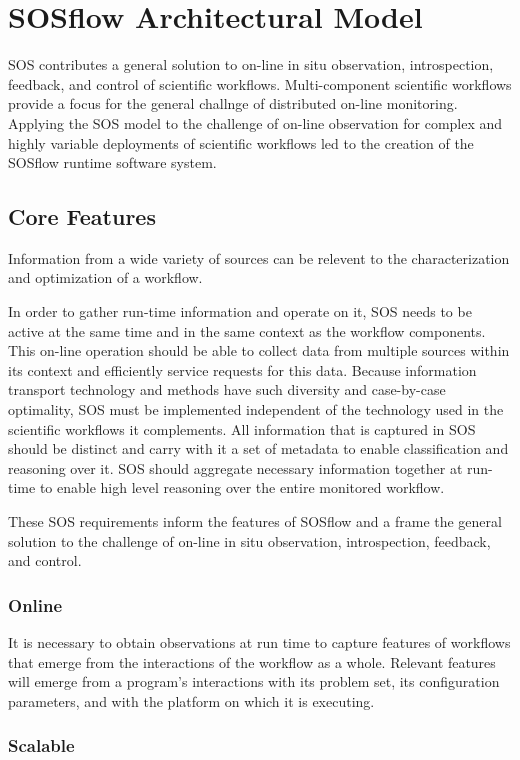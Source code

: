 
\section{SOSflow Architectural Model}
%
SOS contributes a general solution to on-line in situ
observation, introspection, feedback, and control of scientific
workflows.
%
Multi-component scientific workflows provide a focus for the
general challnge of distributed on-line monitoring.
%
Applying the SOS model to the challenge of on-line observation for
complex and highly variable deployments of scientific workflows led to
the creation of the SOSflow runtime software system.
%
\subsection{Core Features}
%
Information from a wide variety of sources can be relevent to the
characterization and optimization of a workflow.
%
\par
%
In order to gather run-time information and operate on it, SOS needs
to be active at the same time and in the same context as the workflow
components.
%
This on-line operation should be able to collect data from multiple
sources within its context and efficiently service requests
for this data.
%
Because information transport technology and methods have such
diversity and case-by-case optimality, SOS must be implemented
independent of the technology used in the scientific workflows it
complements.
%
All information that is captured in SOS should be distinct and carry
with it a set of metadata to enable classification and reasoning over
it.
%
SOS should aggregate necessary information together at run-time to
enable high level reasoning over the entire monitored workflow.
%
\par
%
These SOS requirements inform the features of SOSflow and a frame the
general solution to the challenge of on-line in situ observation,
introspection, feedback, and control.
%
\subsubsection{Online}
%
It is necessary to obtain observations at run time to capture features
of workflows that emerge from the interactions of the workflow as a
whole.
%
Relevant features will emerge from a program's interactions
with its problem set, its configuration parameters, and with the platform on
which it is executing.

%
\subsubsection{Scalable}
%

